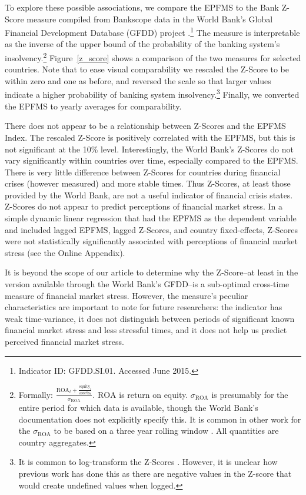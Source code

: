 \documentclass[]{article}
\begin{document}
To explore these possible associations, we compare the EPFMS to the Bank Z-Score measure compiled from Bankscope data in the World Bank's Global Financial Development Database (GFDD) project \citep{worldbank2013}.\footnote{Indicator ID: GFDD.SI.01. Accessed June 2015.} The measure is interpretable as the inverse of the upper bound of the probability of the banking system's insolvency.\footnote{Formally: $\frac{\mathrm{ROA}_{t} + \frac{\mathrm{equity}_{t}}{\mathrm{assets}_{t}}}{\sigma_{\mathrm{ROA}}}$. $\mathrm{ROA}$ is return on equity. $\sigma_{\mathrm{ROA}}$ is presumably for the entire period for which data is available, though the World Bank's documentation does not explicitly specify this. It is common in other work for the $\sigma_{\mathrm{ROA}}$ to be based on a three year rolling window \cite[225]{beck2013bank}. All quantities are country aggregates.} Figure~\ref{z_score} shows a comparison of the two measures for selected countries. Note that to ease visual comparability we rescaled the Z-Score to be within zero and one as before, and reversed the scale so that larger values indicate a higher probability of banking system insolvency.\footnote{It is common to log-transform the Z-Scores \cite[225]{beck2013bank}. However, it is unclear how previous work has done this as there are negative values in the Z-score that would create undefined values when logged.} Finally, we converted the EPFMS to yearly averages for comparability.

There does not appear to be a relationship between Z-Scores and the EPFMS Index. The rescaled Z-Score is positively correlated with the EPFMS, but this is not significant at the 10\% level. Interestingly, the World Bank's Z-Scores do not vary significantly within countries over time, especially compared to the EPFMS. There is very little difference between Z-Scores for countries during financial crises (however measured) and more stable times. Thus Z-Scores, at least those provided by the World Bank, are not a useful indicator of financial crisis states. Z-Scores do not appear to predict perceptions of financial market stress. In a simple dynamic linear regression that had the EPFMS as the dependent variable and included lagged EPFMS, lagged Z-Scores, and country fixed-effects, Z-Scores were not statistically significantly associated with perceptions of financial market stress (see the Online Appendix).

It is beyond the scope of our article to determine why the Z-Score--at least in the version available through the World Bank's GFDD--is a sub-optimal cross-time measure of financial market stress. However, the measure's peculiar characteristics are important to note for future researchers: the indicator has weak time-variance, it does not distinguish between periods of significant known financial market stress and less stressful times, and it does not help us predict perceived financial market stress.
\end{document}
